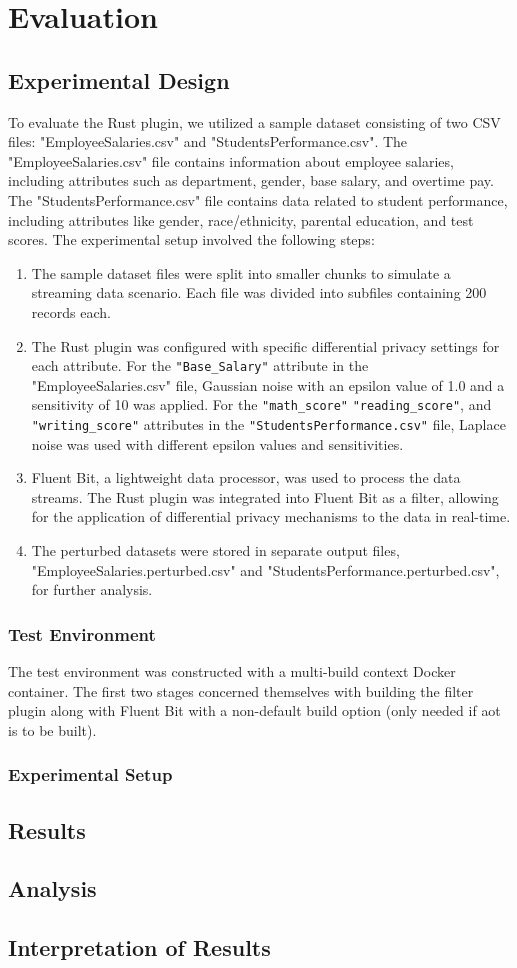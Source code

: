 \chapter{Evaluation\label{chap:evaluation}}
\section{Experimental Design}
To evaluate the Rust plugin, we utilized a sample dataset consisting of two CSV files: "EmployeeSalaries.csv" and "StudentsPerformance.csv". The "EmployeeSalaries.csv" file contains information about employee salaries, including attributes such as department, gender, base salary, and overtime pay. The "StudentsPerformance.csv" file contains data related to student performance, including attributes like gender, race/ethnicity, parental education, and test scores.
The experimental setup involved the following steps:

\begin{enumerate}
\item The sample dataset files were split into smaller chunks to simulate a streaming data scenario. Each file was divided into subfiles containing 200 records each.
\item The Rust plugin was configured with specific differential privacy settings for each attribute. For the \texttt{"Base\_Salary"} attribute in the "EmployeeSalaries.csv" file, Gaussian noise with an epsilon value of 1.0 and a sensitivity of 10 was applied. For the \texttt{"math\_score"} \texttt{"reading\_score"}, and \texttt{"writing\_score"} attributes in the \texttt{"StudentsPerformance.csv"} file, Laplace noise was used with different epsilon values and sensitivities.
\item Fluent Bit, a lightweight data processor, was used to process the data streams. The Rust plugin was integrated into Fluent Bit as a filter, allowing for the application of differential privacy mechanisms to the data in real-time.
\item The perturbed datasets were stored in separate output files, "EmployeeSalaries.perturbed.csv" and "StudentsPerformance.perturbed.csv", for further analysis.
\end{enumerate}
\subsection{Test Environment}
The test environment was constructed with a multi-build context Docker container. The first two stages concerned themselves with building the filter plugin along with Fluent Bit with a non-default build option (only needed if \acrshort{aot} is to be built).
\subsection{Experimental Setup}
\section{Results}
\section{Analysis}
\section{Interpretation of Results}